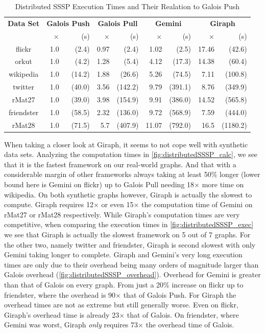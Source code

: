 \begin{table}
\renewcommand{\arraystretch}{1.2}
\tiny
\centering
\caption{Distributed SSSP Execution Times and Their Realation to Galois Push}
\begin{tabular}{crrrrrrrr}
\hline
\bf{Data Set}&
\multicolumn{2}{c}{\bf Galois Push}&\multicolumn{2}{c}{\bf Galois Pull}&\multicolumn{2}{c}{\bf Gemini}&\multicolumn{2}{c}{\bf Giraph}\\
&$\times$&(s)&$\times$&(s)&$\times$&(s)&$\times$&(s)\\\hline
flickr & 1.0 & (2.4) & 0.97 & (2.4) & 1.02 & (2.5) & 17.46 & (42.6)\\
orkut & 1.0 & (4.2) & 1.28 & (5.4) & 4.12 & (17.3) & 14.38 & (60.4)\\
wikipedia & 1.0 & (14.2) & 1.88 & (26.6) & 5.26 & (74.5) & 7.11 & (100.8) \\
twitter & 1.0 & (40.0) & 3.56 & (142.2) & 9.79 & (391.1) & 8.76 & (349.9)\\
rMat27 & 1.0 & (39.0) & 3.98 & (154.9) & 9.91 & (386.0) & 14.52 & (565.8)\\
friendster & 1.0 & (58.5) & 2.32 & (136.0) & 9.72 & (568.9) & 7.59 & (444.0)\\
rMat28 & 1.0 & (71.5) & 5.7 & (407.9) & 11.07 & (792.0) & 16.5 & (1180.2)\\\hline
\end{tabular}
\label{tbl:ssspexec}
\end{table}

When taking a closer look at Giraph, it seems to not cope well with synthetic data sets. Analyzing the computation times in \autoref{fig:distributedSSSP_calc}, we see that it is the fastest framework on our real-world graphs. And that with a considerable margin of other frameworks always taking at least 50\% longer (lower bound here is Gemini on flickr) up to Galois Pull needing 18$\times$ more time on wikipedia.
On both synthetic graphs however, Giraph is actually the slowest to compute. Giraph requires 12$\times$ or even 15$\times$ the computation time of Gemini on rMat27 or rMat28 respectively.
While Giraph's computation times are very competitive, when comparing the execution times in \autoref{fig:distributedSSSP_exec} we see that Giraph is actually the slowest framework on 5 out of 7 graphs. For the other two, namely twitter and friendster, Giraph is second slowest with only Gemini taking longer to complete.
Giraph and Gemini's very long execution times are only due to their overhead being many orders of magnitude larger than Galois overhead (\autoref{fig:distributedSSSP_overhead}).
Overhead for Gemini is greater than that of Galois on every graph. From just a 20\% increase on flickr up to friendster, where the overhead is 90$\times$ that of Galois Push.
For Giraph the overhead times are not as extreme but still generally worse. Even on flickr, Giraph's overhead time is already 23$\times$ that of Galois. On friendster, where Gemini was worst, Giraph \emph{only} requires 73$\times$ the overhead time of Galois.

